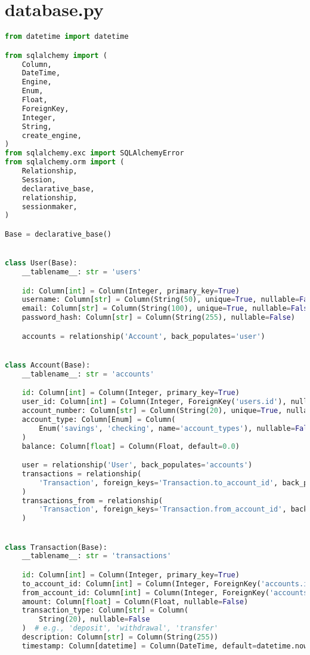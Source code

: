 \section{database.py}
\begin{lstlisting}[language=Python]
from datetime import datetime

from sqlalchemy import (
	Column,
	DateTime,
	Engine,
	Enum,
	Float,
	ForeignKey,
	Integer,
	String,
	create_engine,
)
from sqlalchemy.exc import SQLAlchemyError
from sqlalchemy.orm import (
	Relationship,
	Session,
	declarative_base,
	relationship,
	sessionmaker,
)

Base = declarative_base()


class User(Base):
	__tablename__: str = 'users'

	id: Column[int] = Column(Integer, primary_key=True)
	username: Column[str] = Column(String(50), unique=True, nullable=False)
	email: Column[str] = Column(String(100), unique=True, nullable=False)
	password_hash: Column[str] = Column(String(255), nullable=False)

	accounts = relationship('Account', back_populates='user')


class Account(Base):
	__tablename__: str = 'accounts'

	id: Column[int] = Column(Integer, primary_key=True)
	user_id: Column[int] = Column(Integer, ForeignKey('users.id'), nullable=False)
	account_number: Column[str] = Column(String(20), unique=True, nullable=False)
	account_type: Column[Enum] = Column(
		Enum('savings', 'checking', name='account_types'), nullable=False
	)
	balance: Column[float] = Column(Float, default=0.0)

	user = relationship('User', back_populates='accounts')
	transactions = relationship(
		'Transaction', foreign_keys='Transaction.to_account_id', back_populates='to_account'
	)
	transactions_from = relationship(
		'Transaction', foreign_keys='Transaction.from_account_id', back_populates='from_account'
	)


class Transaction(Base):
	__tablename__: str = 'transactions'

	id: Column[int] = Column(Integer, primary_key=True)
	to_account_id: Column[int] = Column(Integer, ForeignKey('accounts.id'), nullable=False)
	from_account_id: Column[int] = Column(Integer, ForeignKey('accounts.id'), nullable=False)
	amount: Column[float] = Column(Float, nullable=False)
	transaction_type: Column[str] = Column(
		String(20), nullable=False
	)  # e.g., 'deposit', 'withdrawal', 'transfer'
	description: Column[str] = Column(String(255))
	timestamp: Column[datetime] = Column(DateTime, default=datetime.now)


\end{lstlisting}
